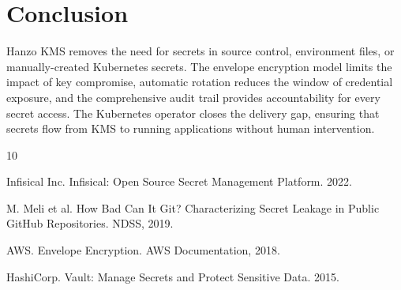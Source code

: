 \documentclass[11pt,twocolumn]{article}
\begin{document}
\section{Conclusion}

Hanzo KMS removes the need for secrets in source control, environment files, or manually-created Kubernetes secrets. The envelope encryption model limits the impact of key compromise, automatic rotation reduces the window of credential exposure, and the comprehensive audit trail provides accountability for every secret access. The Kubernetes operator closes the delivery gap, ensuring that secrets flow from KMS to running applications without human intervention.


\begin{thebibliography}{10}

Infisical Inc. Infisical: Open Source Secret Management Platform. 2022.

M. Meli et al. How Bad Can It Git? Characterizing Secret Leakage in Public GitHub Repositories. NDSS, 2019.

AWS. Envelope Encryption. AWS Documentation, 2018.

HashiCorp. Vault: Manage Secrets and Protect Sensitive Data. 2015.

\end{thebibliography}
\end{document}

